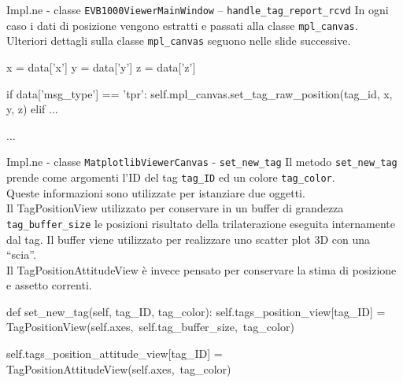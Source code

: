 \begin{frame}[fragile, shrink=10]{Impl.ne - classe \lstinline!EVB1000ViewerMainWindow! -- \lstinline!handle_tag_report_rcvd!}
  In ogni caso  i dati di posizione vengono estratti e passati alla classe \lstinline!mpl_canvas!.\\
  Ulteriori dettagli sulla classe \lstinline!mpl_canvas! seguono nelle slide successive.
  \begin{Python}
            x = data['x']
            y = data['y']
            z = data['z']

            if data['msg_type'] == 'tpr':
                self.mpl_canvas.set_tag_raw_position(tag_id, x, y, z)
            elif ...

            ...
  \end{Python}
\end{frame}


\begin{frame}[fragile, shrink=15]{Impl.ne - classe \lstinline!MatplotlibViewerCanvas! - \lstinline!set_new_tag!}
  Il metodo \lstinline!set_new_tag! prende come argomenti l'ID del tag \lstinline!tag_ID! ed un colore
  \lstinline!tag_color!.\\
  Queste informazioni sono utilizzate per istanziare due oggetti.\\
  Il TagPositionView utilizzato per conservare in un buffer di grandezza \lstinline!tag_buffer_size! le posizioni risultato
  della trilaterazione eseguita internamente dal tag. Il buffer viene utilizzato per realizzare uno scatter plot 3D con una ``scia''.\\
  Il TagPositionAttitudeView è invece pensato per conservare la stima di posizione e assetto correnti.
  \begin{Python}
    def set_new_tag(self, tag_ID, tag_color):
        self.tags_position_view[tag_ID] = 
             TagPositionView(self.axes,\
                             self.tag_buffer_size,\
                             tag_color)

        self.tags_position_attitude_view[tag_ID] = 
             TagPositionAttitudeView(self.axes,\
                                     tag_color) 
  \end{Python}
\end{frame}

